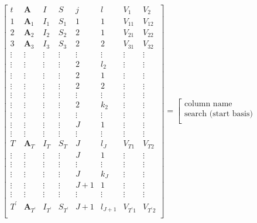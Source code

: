 \begin{equation}
\renewcommand\arraystretch{2}  %
\left[
\begin{array}{c|ccc|cc|cc}
t & \mathbf{A} & I & S & j &  l  & V_{1} & V_{2}\\
\hline
1 & \mathbf{A}_1 & I_1 & S_1 & 1 & 1 & V_{11} & V_{12}\\
\hline
2 & \mathbf{A}_2 & I_2 & S_2 & 2 & 1  & V_{21}  & V_{22}\\
3 & \mathbf{A}_3 & I_3 & S_3 & 2 & 2  & V_{31}  & V_{32}\\
\vdots & \vdots &\vdots &\vdots  &\vdots & \vdots &\vdots  &\vdots\\
\vdots & \vdots & \vdots &\vdots & 2 & l_2 & \vdots  & \vdots\\
\hline
\vdots &\vdots & \vdots &\vdots & 2  & 1& \vdots & \vdots\\
\vdots &\vdots &\vdots &\vdots & 2 & 2& \vdots &  \vdots\\
\vdots &\vdots &\vdots &\vdots &\vdots & \vdots & \vdots  &\vdots \\
\vdots &\vdots &\vdots &\vdots & 2 & k_2 &\vdots  & \vdots\\
\hline
\vdots &\vdots &\vdots &\vdots &\vdots & \vdots &\vdots &\vdots \\
\hline
\vdots & \vdots & \vdots &\vdots  & J &  1 & \vdots & \vdots \\
\vdots &\vdots &\vdots &\vdots &\vdots & \vdots &\vdots &\vdots \\
T & \mathbf{A}_T & I_T &S_T  & J &  l_{J} & V_{T1}& V_{T2}\\
\hline
\vdots &\vdots & \vdots &\vdots & J  & 1& \vdots & \vdots\\
\vdots &\vdots &\vdots &\vdots &\vdots & \vdots & \vdots  &\vdots \\
\vdots &\vdots &\vdots &\vdots & J & k_J &\vdots  & \vdots\\
\hline
\vdots& \vdots & \vdots & \vdots & J+1 & 1 & \vdots& \vdots\\
\vdots &\vdots &\vdots &\vdots &\vdots & \vdots &\vdots &\vdots \\
T^\prime & \mathbf{A}_{T^\prime} & I_{T^\prime} &S_{T^\prime}  & J+1 &  l_{J+1} & V_{T^\prime 1}& V_{T^\prime 2}\\
\end{array}
\right]
= 
\left[
\begin{array}{c}
\text{column name} \\
\hline
\text{search (start basis)} \\

\end{array}
\end{equation}
